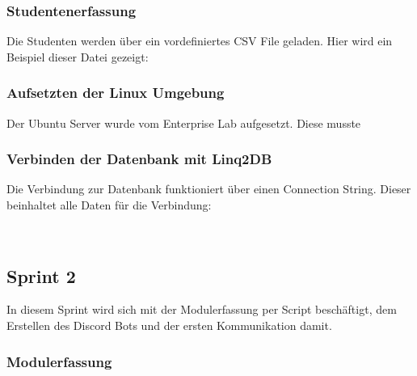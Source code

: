 \documentclass[a4paper, table]{article}
\begin{document}
\subsubsection{Studentenerfassung}

Die Studenten werden über ein vordefiniertes CSV File geladen.
Hier wird ein Beispiel dieser Datei gezeigt:





\subsubsection{Aufsetzten der Linux Umgebung}

Der Ubuntu Server wurde vom Enterprise Lab aufgesetzt.
Diese musste 



\subsubsection{Verbinden der Datenbank mit Linq2DB}

Die Verbindung zur Datenbank funktioniert über einen Connection String.
Dieser beinhaltet alle Daten für die Verbindung:

\begin{lstlisting}
    
\end{lstlisting}

\newpage
\subsection{Sprint 2}
In diesem Sprint wird sich mit der Modulerfassung per Script beschäftigt, 
dem Erstellen des Discord Bots und der ersten Kommunikation damit.

\subsubsection{Modulerfassung}
\end{document}
